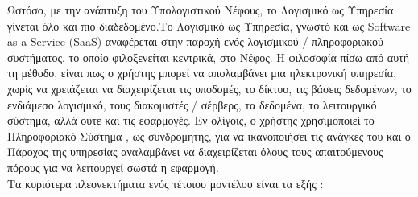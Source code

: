 \documentclass{article}
\begin{document}
Ωστόσο, με την ανάπτυξη του Υπολογιστικού Νέφους, το Λογισμικό ως Υπηρεσία γίνεται όλο και πιο διαδεδομένο.Το Λογισμικό ως Υπηρεσία, γνωστό και ως Software as a Service (SaaS) αναφέρεται στην παροχή ενός λογισμικού / πληροφοριακού συστήματος, το οποίο φιλοξενείται κεντρικά, στο Νέφος. Η φιλοσοφία πίσω από αυτή τη μέθοδο, είναι πως ο χρήστης μπορεί να απολαμβάνει μια ηλεκτρονική υπηρεσία, χωρίς να χρειάζεται να διαχειρίζεται τις υποδομές, το δίκτυο, τις βάσεις δεδομένων, το ενδιάμεσο λογισμικό, τους διακομιστές / σέρβερς, τα δεδομένα, το λειτουργικό σύστημα, αλλά ούτε και τις εφαρμογές. Εν ολίγοις, ο χρήστης χρησιμοποιεί το Πληροφοριακό Σύστημα , ως συνδρομητής, για να ικανοποιήσει τις ανάγκες του και ο Πάροχος της υπηρεσίας αναλαμβάνει να διαχειρίζεται όλους τους απαιτούμενους πόρους για να λειτουργεί σωστά η εφαρμογή.  \\ 
Τα κυριότερα πλεονεκτήματα ενός τέτοιου μοντέλου είναι τα εξής :
\end{document}
